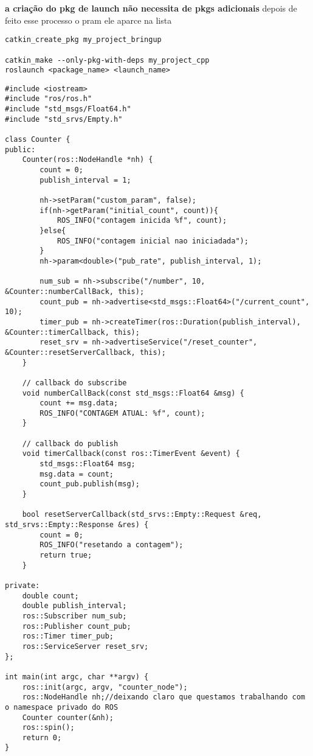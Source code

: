 \documentclass[letterpaper]{article}
\begin{document}
\textbf{a criação do pkg de launch não necessita de pkgs adicionais}
depois de feito esse processo o pram ele aparce na lista
\begin{lstlisting}[style=bashstyle, title=terminal ROS] 
catkin_create_pkg my_project_bringup

catkin_make --only-pkg-with-deps my_project_cpp
roslaunch <package_name> <launch_name> 
\end{lstlisting}
\begin{lstlisting}[style=cppstyle, title=counter.cpp] 
#include <iostream>
#include "ros/ros.h"
#include "std_msgs/Float64.h"
#include "std_srvs/Empty.h"

class Counter {
public:
    Counter(ros::NodeHandle *nh) {
        count = 0;                                                                           
        publish_interval = 1;

        nh->setParam("custom_param", false);
        if(nh->getParam("initial_count", count)){
            ROS_INFO("contagem inicida %f", count);
        }else{
            ROS_INFO("contagem inicial nao iniciadada");
        }
        nh->param<double>("pub_rate", publish_interval, 1);

        num_sub = nh->subscribe("/number", 10, &Counter::numberCallBack, this);
        count_pub = nh->advertise<std_msgs::Float64>("/current_count", 10);
        timer_pub = nh->createTimer(ros::Duration(publish_interval), &Counter::timerCallback, this);
        reset_srv = nh->advertiseService("/reset_counter", &Counter::resetServerCallback, this);
    }

    // callback do subscribe
    void numberCallBack(const std_msgs::Float64 &msg) {
        count += msg.data;
        ROS_INFO("CONTAGEM ATUAL: %f", count);
    }

    // callback do publish
    void timerCallback(const ros::TimerEvent &event) {
        std_msgs::Float64 msg;
        msg.data = count;
        count_pub.publish(msg); 
    }

    bool resetServerCallback(std_srvs::Empty::Request &req, std_srvs::Empty::Response &res) {
        count = 0;
        ROS_INFO("resetando a contagem");
        return true;
    }

private:
    double count;
    double publish_interval;
    ros::Subscriber num_sub;
    ros::Publisher count_pub;
    ros::Timer timer_pub;
    ros::ServiceServer reset_srv;
};

int main(int argc, char **argv) {
    ros::init(argc, argv, "counter_node");
    ros::NodeHandle nh;//deixando claro que questamos trabalhando com o namespace privado do ROS
    Counter counter(&nh);
    ros::spin();
    return 0;
}

\end{lstlisting}
\end{document}
